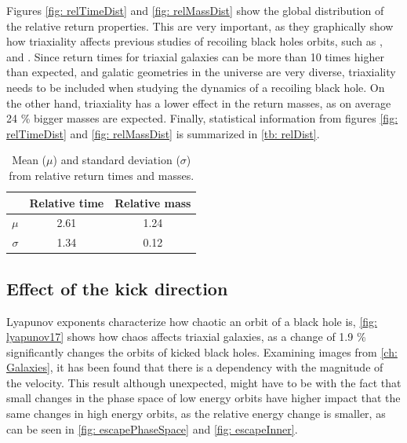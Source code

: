 	Figures \ref{fig: relTimeDist} and \ref{fig: relMassDist} show the global distribution of the relative return properties. This are very important, as they graphically show how triaxiality affects previous studies of recoiling black holes orbits, such as \citeauthor{choksi2017recoiling}, \citeauthor{tanaka2009assembly} and \citeauthor{gualandris2008ejection}. Since return times for triaxial galaxies can be more than 10 times higher than expected, and galatic geometries in the universe are very diverse, triaxiality needs to be included when studying the dynamics of a recoiling black hole. On the other hand, triaxiality has a lower effect in the return masses, as on average 24 \% bigger masses are expected. Finally, statistical information from figures \ref{fig: relTimeDist} and \ref{fig: relMassDist} is summarized in \autoref{tb: relDist}.
	\begin{table}[h]
		\centering
		\caption{Mean ($\mu$) and standard deviation ($\sigma$) from relative return times and masses.}
		\begin{tabular}{r|cc}
			\hline & \textbf{Relative time} & \textbf{Relative mass} \\
			\hline
			$\mu$ & 2.61 & 1.24 \\
			$\sigma$ & 1.34 & 0.12 \\
			\hline
		\end{tabular}
		\label{tb: relDist}
	\end{table}
	
	\newpage
	\subsection{Effect of the kick direction}
	Lyapunov exponents characterize how chaotic an orbit of a black hole is, \autoref{fig: lyapunov17} shows how chaos affects triaxial galaxies, as a change of 1.9 \% significantly changes the orbits of kicked black holes. Examining images from \autoref{ch: Galaxies}, it has been found that there is a dependency with the magnitude of the velocity. This result although unexpected, might have to be with the fact that small changes in the phase space of low energy orbits have higher impact that the same changes in high energy orbits, as the relative energy change is smaller, as can be seen in \autoref{fig: escapePhaseSpace} and \autoref{fig: escapeInner}.
	
